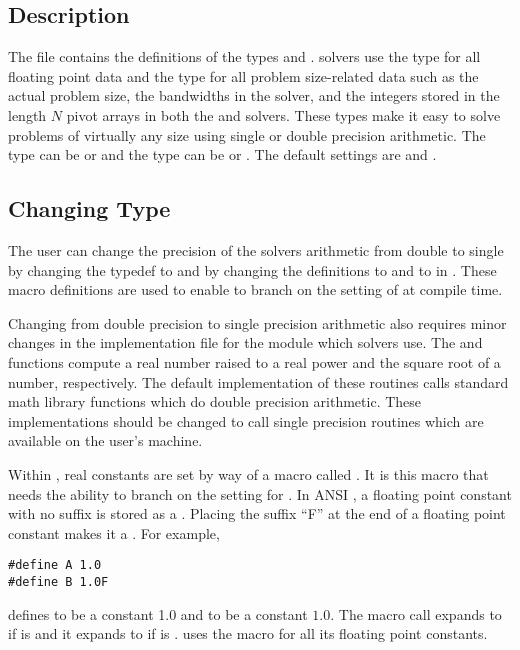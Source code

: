 %
\subsection{Description}

The  file contains the definitions of the types  and
. {\sundials} solvers use the type  for all floating point data and
the type  for all problem size-related data such as the actual
problem size, the bandwidths in the {\band} solver, and the integers
stored in the length $N$ pivot arrays in both the {\dense} and {\band} solvers.
These types make it easy to solve problems of virtually any size
using single or double precision arithmetic. The type  can be
 or  and the type  can be  or
. The default settings are  and .

\subsection{Changing Type }

The user can change the precision of the {\sundials} solvers arithmetic from double to single
by changing the typedef  to 
and by changing the definitions
 to 
and  to 
in .
These macro definitions are used to enable  to branch on
the setting of  at compile time. 

Changing from double precision to single precision arithmetic also
requires minor changes in the implementation file  for
the {\sundialsmath} module which {\sundials} solvers use. The  and
 functions compute a real number raised to a real power and the
square root of a number, respectively. The default implementation of
these routines calls standard {\C} math library functions which do double
precision arithmetic. These implementations should be changed to call
single precision routines which are available on the user's machine.

Within {\sundials}, real constants are set by way of a macro called
.  It is this macro that needs the ability to branch on the
setting for .  In ANSI {\C}, a floating point constant with no
suffix is stored as a .  Placing the suffix ``F'' at the
end of a floating point constant makes it a . For example,
\begin{verbatim}
#define A 1.0
#define B 1.0F
\end{verbatim}
defines  to be a  constant 1.0 and  to be a
 constant $1.0$. The macro call 
expands to  if  is  and it expands to
 if  is . {\sundials} uses the  macro for
all its floating point constants. 

